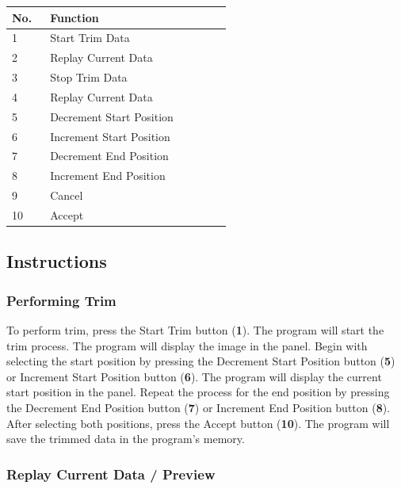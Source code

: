 \begin{table}[!ht]
    \centering
    \begin{tabular}{p{0.05\linewidth} | p{0.5\linewidth}}
        \hline
        \textbf{No.} & \textbf{Function}        \\ \hline
        1            & Start Trim Data          \\ \hline
        2            & Replay Current Data      \\ \hline
        3            & Stop Trim Data           \\ \hline
        4            & Replay Current Data      \\ \hline
        5            & Decrement Start Position \\ \hline
        6            & Increment Start Position \\ \hline
        7            & Decrement End Position   \\ \hline
        8            & Increment End Position   \\ \hline
        9            & Cancel                   \\ \hline
        10           & Accept                   \\ \hline
    \end{tabular}
\end{table}


\subsection{Instructions}

\subsubsection{Performing Trim}

To perform trim, press the Start Trim button (\textbf{1}). The program will start the trim process. The program will display the image in the panel. Begin with selecting the start position by pressing the Decrement Start Position button (\textbf{5}) or Increment Start Position button (\textbf{6}). The program will display the current start position in the panel. Repeat the process for the end position by pressing the Decrement End Position button (\textbf{7}) or Increment End Position button (\textbf{8}). After selecting both positions, press the Accept button (\textbf{10}). The program will save the trimmed data in the program's memory.

\subsubsection{Replay Current Data / Preview}

